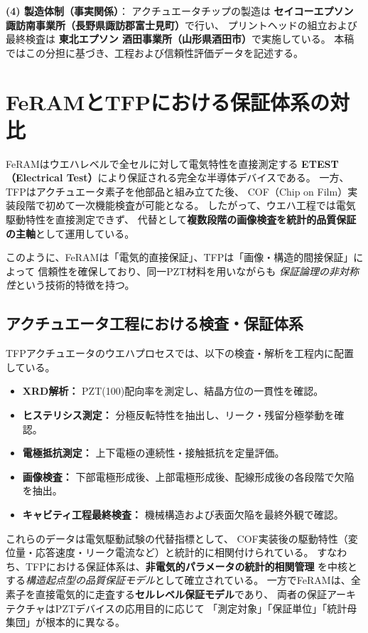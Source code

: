 \documentclass[conference]{IEEEtran}
\begin{document}
\medskip
\noindent
\textbf{(4) 製造体制（事実関係）}：
アクチュエータチップの製造は
\textbf{セイコーエプソン 諏訪南事業所（長野県諏訪郡富士見町）}で行い、
プリントヘッドの組立および最終検査は
\textbf{東北エプソン 酒田事業所（山形県酒田市）}で実施している。
本稿ではこの分担に基づき、工程および信頼性評価データを記述する。

\section{FeRAMとTFPにおける保証体系の対比}
FeRAMはウエハレベルで全セルに対して電気特性を直接測定する
\textbf{ETEST（Electrical Test）}により保証される完全な半導体デバイスである。
一方、TFPはアクチュエータ素子を他部品と組み立てた後、
COF（Chip on Film）実装段階で初めて一次機能検査が可能となる。
したがって、ウエハ工程では電気駆動特性を直接測定できず、
代替として\textbf{複数段階の画像検査を統計的品質保証の主軸}として運用している。

このように、FeRAMは「電気的直接保証」、TFPは「画像・構造的間接保証」によって
信頼性を確保しており、同一PZT材料を用いながらも
\emph{保証論理の非対称性}という技術的特徴を持つ。

\subsection{アクチュエータ工程における検査・保証体系}
TFPアクチュエータのウエハプロセスでは、以下の検査・解析を工程内に配置している。
\begin{itemize}
  \item \textbf{XRD解析：} PZT(100)配向率を測定し、結晶方位の一貫性を確認。
  \item \textbf{ヒステリシス測定：} 分極反転特性を抽出し、リーク・残留分極挙動を確認。
  \item \textbf{電極抵抗測定：} 上下電極の連続性・接触抵抗を定量評価。
  \item \textbf{画像検査：} 下部電極形成後、上部電極形成後、配線形成後の各段階で欠陥を抽出。
  \item \textbf{キャビティ工程最終検査：} 機械構造および表面欠陥を最終外観で確認。
\end{itemize}

これらのデータは電気駆動試験の代替指標として、
COF実装後の駆動特性（変位量・応答速度・リーク電流など）と統計的に相関付けられている。
すなわち、TFPにおける保証体系は、\textbf{非電気的パラメータの統計的相関管理}
を中核とする\emph{構造起点型の品質保証モデル}として確立されている。
一方でFeRAMは、全素子を直接電気的に走査する\textbf{セルレベル保証モデル}であり、
両者の保証アーキテクチャはPZTデバイスの応用目的に応じて
「測定対象」「保証単位」「統計母集団」が根本的に異なる。
\end{document}
